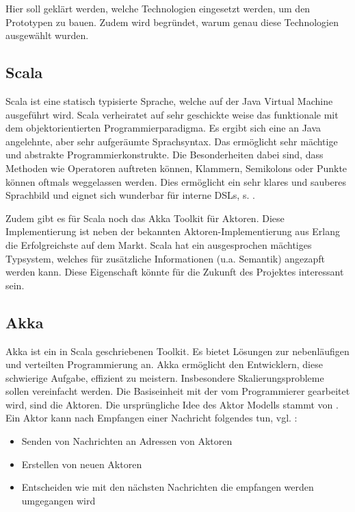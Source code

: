 Hier soll geklärt werden, welche Technologien eingesetzt werden, um den Prototypen zu bauen. Zudem wird begründet, warum genau diese Technologien ausgewählt wurden.

 
\subsection{Scala}\label{}
 
Scala ist eine statisch typisierte Sprache, welche auf der Java Virtual Machine ausgeführt wird. Scala verheiratet auf sehr geschickte weise das funktionale mit dem objektorientierten Programmierparadigma. Es ergibt sich eine an Java angelehnte, aber sehr aufgeräumte Sprachsyntax. Das ermöglicht sehr mächtige und abstrakte Programmierkonstrukte. Die Besonderheiten dabei sind, dass Methoden wie Operatoren auftreten können, Klammern, Semikolons oder Punkte können oftmals weggelassen werden. Dies ermöglicht ein sehr klares und sauberes Sprachbild und eignet sich wunderbar für interne DSLs, s. \citep{Hodapp}.

 
Zudem gibt es für Scala noch das Akka Toolkit für Aktoren. Diese Implementierung ist neben der bekannten Aktoren-Implementierung aus Erlang die Erfolgreichste auf dem Markt. Scala hat ein ausgesprochen mächtiges Typsystem, welches für zusätzliche Informationen (u.a. Semantik) angezapft werden kann. Diese Eigenschaft könnte für die Zukunft des Projektes interessant sein.

 
\subsection{Akka}\label{}
 
Akka ist ein in Scala geschriebenen Toolkit. Es bietet Lösungen zur nebenläufigen und verteilten Programmierung an. Akka ermöglicht den Entwicklern, diese schwierige Aufgabe, effizient zu meistern. Insbesondere Skalierungsprobleme sollen vereinfacht werden. Die Basiseinheit mit der vom Programmierer gearbeitet wird, sind die Aktoren. Die ursprüngliche Idee des Aktor Modells stammt von \citep{Hewitt}. Ein Aktor kann nach Empfangen einer Nachricht folgendes tun, vgl. \citep{Hewitt2}:

 
\begin{itemize}

\item Senden von Nachrichten an Adressen von Aktoren
\item Erstellen von neuen Aktoren
\item Entscheiden wie mit den nächsten Nachrichten die empfangen werden umgegangen wird
\end{itemize}
 
